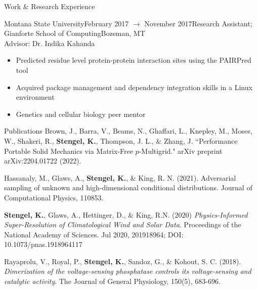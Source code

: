 \documentclass{resume} %
\begin{document}
\begin{rSection}{Work \& Research Experience}
\begin{rSubsection}{Montana State University}{February 2017 $\to$ November 2017}{Research Assistant; Gianforte School of Computing}{Bozeman, MT}\\
Advisor: Dr. Indika Kahanda
\begin{itemize}
        \setlength \itemsep{-0.4em}
        \item Predicted residue level protein-protein interaction sites using the PAIRPred tool
        \item Acquired package management and dependency integration skills in a Linux environment
        \item Genetics and cellular biology peer mentor
        \end{itemize}
\end{rSubsection}

\end{rSection}
\newpage
\iftrue
\begin{rSection}{Publications}
Brown, J., Barra, V., Beams, N., Ghaffari, L., Knepley, M., Moses, W., Shakeri, R.,  \textbf{Stengel, K.}, Thompson, J. L., \& Zhang, J. ``Performance Portable Solid Mechanics via Matrix-Free $p$-Multigrid." arXiv preprint arXiv:2204.01722 (2022).

Hassanaly, M., Glaws, A., \textbf{Stengel, K.}, \& King, R. N. (2021). Adversarial sampling of unknown and high-dimensional conditional distributions. Journal of Computational Physics, 110853.

\textbf{Stengel, K.}, Glaws, A., Hettinger, D., \& King, R.N. (2020) \textit{Physics-Informed Super-Resolution of Climatological Wind and Solar Data}. Proceedings of the National Academy of Sciences. Jul 2020, 201918964; DOI: 10.1073/pnas.1918964117

Rayaprolu, V., Royal, P., \textbf{Stengel, K.}, Sandoz, G., \& Kohout, S. C. (2018). \textit{Dimerization of the voltage-sensing phosphatase controls its voltage-sensing and catalytic activity}. The Journal of General Physiology, 150(5), 683-696.
\end{rSection}
\fi
\end{document}
